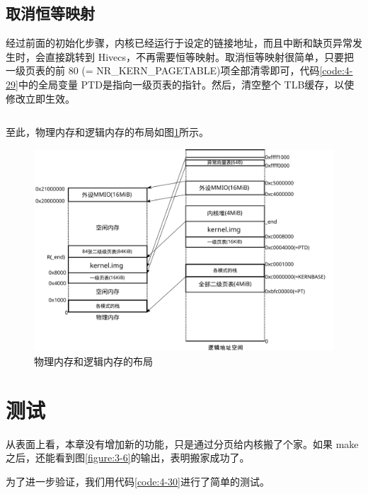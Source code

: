 \documentclass[main.tex]{subfiles}
\begin{document}
\begin{CJK*}{UTF8}{song}
\subsection{取消恒等映射}
经过前面的初始化步骤，内核已经运行于设定的链接地址，而且中断和缺页异常发生时，会直接跳转到 Hivecs，不再需要恒等映射。取消恒等映射很简单，只要把一级页表的前 80 (= NR\_\-KERN\_\-PAGE\-TABLE)项全部清零即可，代码\ref{code:4-29}中的全局变量 PTD是指向一级页表的指针。然后，清空整个 TLB缓存，以使修改立即生效。

\begin{code}
\label{code:4-29}
\inputminted[firstline=406,lastline=418,linenos,numbersep=5pt,frame=lines,framesep=2mm]{c}{src/chapter04/kernel/machdep.c}
\end{code}

至此，物理内存和逻辑内存的布局如图\ref{figure:4-9}所示。

\begin{figure}[htp]
\centering
\includegraphics[scale=0.4]{figures/4-9}
\caption{物理内存和逻辑内存的布局}
\label{figure:4-9}
\end{figure}

\section{测试}
从表面上看，本章没有增加新的功能，只是通过分页给内核搬了个家。如果 make之后，还能看到图\ref{figure:3-6}的输出，表明搬家成功了。

\par
为了进一步验证，我们用代码\ref{code:4-30}进行了简单的测试。

\begin{code}
\label{code:4-30}
\inputminted[firstline=448,lastline=457,linenos,numbersep=5pt,frame=lines,framesep=2mm]{c}{src/chapter04/kernel/machdep.c}
\end{code}


\end{CJK*}
\end{document}
